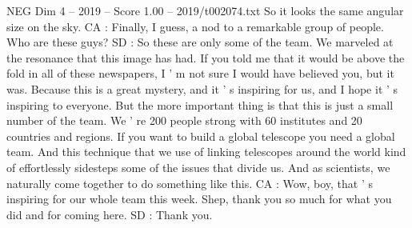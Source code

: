 \begin{textsample}{NEG Dim 4 – 2019 – Score 1.00 – 2019/t002074.txt}
So it looks the same angular size on the sky.
CA : Finally, I guess, a nod to a remarkable group of people.
Who are these guys?
SD : So these are only some of the team.
We marveled at the resonance that this image has had.
If you told me that it would be above the fold in all of these newspapers, I ' m not sure I would have believed you, but it was.
Because this is a great mystery, and it ' s inspiring for us, and I hope it ' s inspiring to everyone.
But the more important thing is that this is just a small number of the team.
We ' re 200 people strong with 60 institutes and 20 countries and regions.
If you want to build a global telescope you need a global team.
And this technique that we use of linking telescopes around the world kind of effortlessly sidesteps some of the issues that divide us.
And as scientists, we naturally come together to do something like this.
CA : Wow, boy, that ' s inspiring for our whole team this week.
Shep, thank you so much for what you did and for coming here.
SD : Thank you.

\end{textsample}
